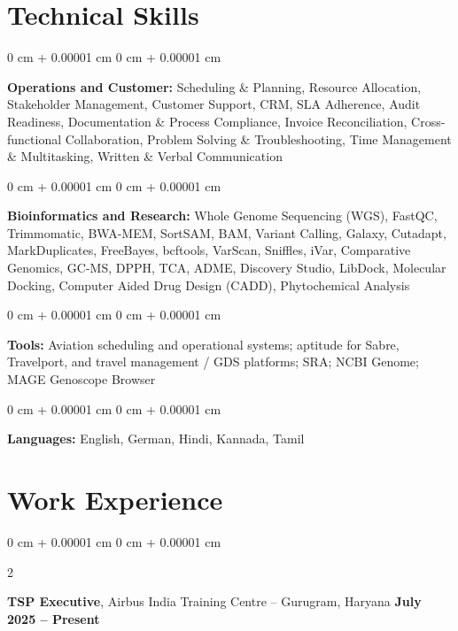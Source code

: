 \documentclass[10pt, letterpaper]{article}
\newenvironment{onecolentry}{
    \begin{adjustwidth}{
        0 cm + 0.00001 cm
    }{
        0 cm + 0.00001 cm
    }
}{
    \end{adjustwidth}
} %
\newenvironment{twocolentry}[2][]{
    \onecolentry
    \def\secondColumn{#2}
    \setcolumnwidth{\fill, 4.5 cm}
    \begin{paracol}{2}
}{
    \switchcolumn \raggedleft \secondColumn
    \end{paracol}
    \endonecolentry
} %
\begin{document}
    \section{Technical Skills}
    \vspace{2 pt }
    \begin{onecolentry}
    \textbf{Operations and Customer:} Scheduling \& Planning, Resource Allocation, Stakeholder Management, Customer Support, CRM, SLA Adherence, Audit Readiness, Documentation \& Process Compliance, Invoice Reconciliation, Cross-functional Collaboration, Problem Solving \& Troubleshooting, Time Management \& Multitasking, Written \& Verbal Communication
    \end{onecolentry}
    \begin{onecolentry}
        \textbf{Bioinformatics and Research:} Whole Genome Sequencing (WGS), FastQC, Trimmomatic, BWA-MEM, SortSAM, BAM, Variant Calling, Galaxy, Cutadapt, MarkDuplicates, FreeBayes, bcftools, VarScan, Sniffles, iVar, Comparative Genomics, GC-MS, DPPH, TCA, ADME, Discovery Studio, LibDock, Molecular Docking, Computer Aided Drug Design (CADD), Phytochemical Analysis
    \end{onecolentry}
    \begin{onecolentry}
        \textbf{Tools:} Aviation scheduling and operational systems; aptitude for Sabre, Travelport, and travel management / GDS platforms; SRA; NCBI Genome; MAGE Genoscope Browser
    \end{onecolentry}
    \begin{onecolentry}
        \textbf{Languages:} English, German, Hindi, Kannada, Tamil
    \end{onecolentry}

    \vspace{2 pt }
    \section{Work Experience}
        \vspace{0.1cm}

        \begin{twocolentry}{
            \textbf{July 2025 -- Present}
        }
            \textbf{TSP Executive}, Airbus India Training Centre -- Gurugram, Haryana\end{twocolentry}
\end{document}

